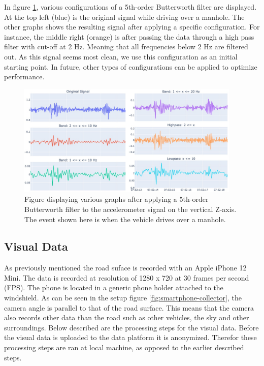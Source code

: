 In figure \ref{fig:filter}, various configurations of a 5th-order Butterworth filter are displayed. At the top left (blue) is the original signal while driving over a manhole. The other graphs shows the resulting signal after applying a specific configuration. For instance, the middle right (orange) is after passing the data through a high pass filter with cut-off at 2 Hz. Meaning that all frequencies below 2 Hz are filtered out. As this signal seems most clean, we use this configuration as an initial starting point. In future, other types of configurations can be applied to optimize performance. 


\begin{figure}[H]
\begin{center}
\includegraphics[width=0.95\textwidth,keepaspectratio]{images/4_data/filter-example.jpg}
\end{center}
\captionsetup{width=.95\textwidth}
\caption{Figure displaying various graphs after applying a 5th-order Butterworth filter to the accelerometer signal on the vertical Z-axis. The event shown here is when the vehicle drives over a manhole.}
\label{fig:filter}
\end{figure}




\subsection{Visual Data}
\label{sec:visual-data}

As previously mentioned the road suface is recorded with an Apple iPhone 12 Mini. The data is recorded at resolution of 1280 x 720 at 30 frames per second (FPS). The phone is located in a generic  phone holder attached to the windshield. As can be seen in the setup figure \ref{fig:smartphone-collector}, the camera angle is parallel to that of the road surface. This means that the camera also records other data than the road such as other vehicles, the sky and other surroundings. Below described are the processing steps for the visual data. Before the visual data is uploaded to the data platform it is anonymized. Therefor these processing steps are ran at local machine, as opposed to the earlier described steps.


